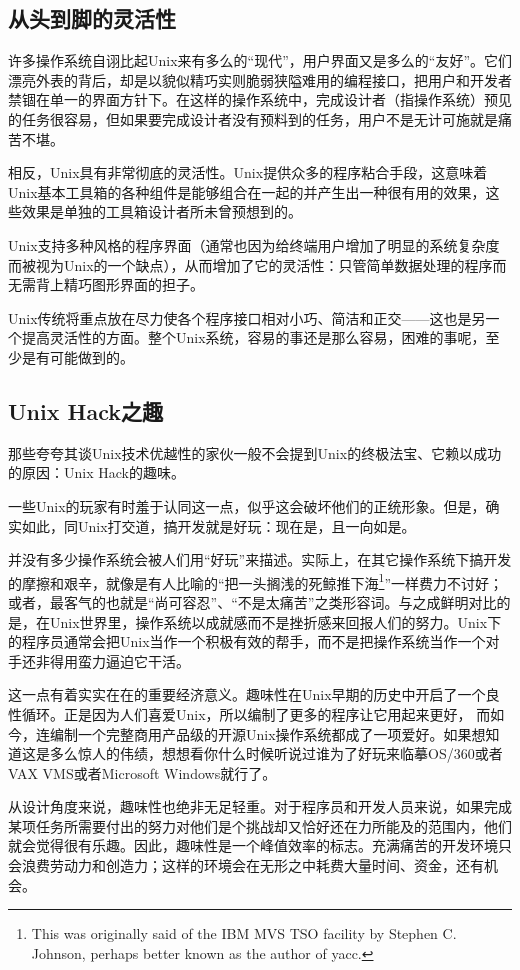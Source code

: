 \documentclass[12pt,oneside]{ctexbook}
\begin{document}
\begin{common-format}
\subsection{从头到脚的灵活性}
许多操作系统自诩比起Unix来有多么的“现代”，用户界面又是多么的“友好”。它们漂亮外表的背后，却是以貌似精巧实则脆弱狭隘难用的编程接口，把用户和开发者禁锢在单一的界面方针下。在这样的操作系统中，完成设计者（指操作系统）预见的任务很容易，但如果要完成设计者没有预料到的任务，用户不是无计可施就是痛苦不堪。

相反，Unix具有非常彻底的灵活性。Unix提供众多的程序粘合手段，这意味着Unix基本工具箱的各种组件是能够组合在一起的并产生出一种很有用的效果，这些效果是单独的工具箱设计者所未曾预想到的。

Unix支持多种风格的程序界面（通常也因为给终端用户增加了明显的系统复杂度而被视为Unix的一个缺点），从而增加了它的灵活性：只管简单数据处理的程序而无需背上精巧图形界面的担子。

Unix传统将重点放在尽力使各个程序接口相对小巧、简洁和正交——这也是另一个提高灵活性的方面。整个Unix系统，容易的事还是那么容易，困难的事呢，至少是有可能做到的。

\subsection{Unix Hack之趣}
那些夸夸其谈Unix技术优越性的家伙一般不会提到Unix的终极法宝、它赖以成功的原因：Unix Hack的趣味。

一些Unix的玩家有时羞于认同这一点，似乎这会破坏他们的正统形象。但是，确实如此，同Unix打交道，搞开发就是好玩：现在是，且一向如是。

并没有多少操作系统会被人们用“好玩”来描述。实际上，在其它操作系统下搞开发的摩擦和艰辛，就像是有人比喻的“把一头搁浅的死鲸推下海\footnote{This was originally said of the IBM MVS TSO facility by Stephen C. Johnson, perhaps better known as the author of yacc.}”一样费力不讨好；或者，最客气的也就是“尚可容忍”、“不是太痛苦”之类形容词。与之成鲜明对比的是，在Unix世界里，操作系统以成就感而不是挫折感来回报人们的努力。Unix下的程序员通常会把Unix当作一个积极有效的帮手，而不是把操作系统当作一个对手还非得用蛮力逼迫它干活。

这一点有着实实在在的重要经济意义。趣味性在Unix早期的历史中开启了一个良性循环。正是因为人们喜爱Unix，所以编制了更多的程序让它用起来更好，  而如今，连编制一个完整商用产品级的开源Unix操作系统都成了一项爱好。如果想知道这是多么惊人的伟绩，想想看你什么时候听说过谁为了好玩来临摹OS/360或者VAX VMS或者Microsoft Windows就行了。

从设计角度来说，趣味性也绝非无足轻重。对于程序员和开发人员来说，如果完成某项任务所需要付出的努力对他们是个挑战却又恰好还在力所能及的范围内，他们就会觉得很有乐趣。因此，趣味性是一个峰值效率的标志。充满痛苦的开发环境只会浪费劳动力和创造力；这样的环境会在无形之中耗费大量时间、资金，还有机会。


\end{common-format}
\end{document}
